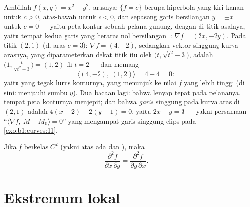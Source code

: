 \begin{example}
\label{ex:b1:multivar:levelcurves}
Ambillah $f(x, y) = x^2 - y^2$.  arasnya: $\{f = c\}$ berupa
hiperbola yang  kiri-kanan untuk $c > 0$, atas-bawah untuk $c < 0$,
dan sepasang garis bersilangan $y = \pm x$ untuk $c = 0$ --- yaitu
peta kontur sebuah pelana gunung, dengan  di
titik asalnya, yaitu tempat kedua garis yang beraras nol bersilangan. : $\nabla
f = (2x, -2y)$. Pada titik $(2, 1)$ (di aras $c = 3$):
$\nabla f = (4, -2)$, sedangkan vektor singgung kurva
arasnya, yang diparameterkan dekat titik itu oleh $\bigl(t,
\sqrt{t^2 - 3}\bigr)$, adalah $\bigl(1, \frac{t}{\sqrt{t^2 -
3}}\bigr) = (1, 2)$ di $t = 2$ --- dan memang
\[
\langle (4, -2),\ (1, 2)\rangle = 4 - 4 = 0 :
\]
yaitu  yang tegak lurus konturnya, yang menunjuk ke nilai $f$
yang lebih tinggi (di sini: menjauhi sumbu $y$). Dua bacaan
lagi: bahwa  lenyap tepat pada pelananya, tempat
peta konturnya menjepit; dan bahwa \emph{garis} singgung pada
kurva aras di $(2,1)$ adalah $4(x - 2) - 2(y - 1) = 0$, yaitu $2x -
y = 3$ --- yakni persamaan ``$\langle \nabla f,\ M - M_0\rangle =
0$'' yang mengampat garis singgung elips pada
\cref{exo:b1:curves:11}.
\end{example}

\begin{theorem}[Schwarz]\label{thm:b1:multivar:schwarz}
Jika $f$ berkelas $C^2$ (yakni  atas  ada dan
), maka
\[
\frac{\partial^2 f}{\partial x\,\partial y}
= \frac{\partial^2 f}{\partial y\,\partial x} .
\]
\end{theorem}
\admitted

\section{Ekstremum lokal}

